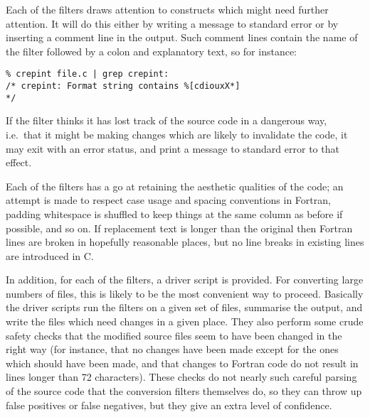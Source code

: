 \documentclass[twoside,11pt]{article}
\renewcommand{\_}{\texttt{\symbol{95}}}
\begin{document}
Each of the filters draws attention to constructs which might need 
further attention.  It will do this either by writing a message to
standard error or by inserting a comment line in the output.
Such comment lines contain the name of the filter followed by a colon
and explanatory text, so for instance:
\begin{squote}
\begin{verbatim}
% crepint file.c | grep crepint:
/* crepint: Format string contains %[cdiouxX*]                           */
\end{verbatim}
\end{squote}
If the filter thinks it has lost track of the source code in a dangerous
way, i.e.\ that it might be making changes which are likely to invalidate
the code, it may exit with an error status, and print a message to standard
error to that effect.

Each of the filters has a go at retaining the aesthetic 
qualities of the code; an attempt is made to respect 
case usage and spacing conventions in Fortran, 
padding whitespace is shuffled to keep things at the same column as
before if possible, and so on.
If replacement text is longer than the original
then Fortran lines are broken in hopefully reasonable places,
but no line breaks in existing lines are introduced in C.

In addition, for each of the filters, a driver script is provided. 
For converting large numbers of files, this is likely to be the 
most convenient way to proceed.  Basically the driver scripts 
run the filters on a given set of files, summarise the output, and
write the files which need changes in a given place.
They also perform some crude safety checks that the modified source
files seem to have been changed in the right way (for instance, that
no changes have been made except for the ones which should have been
made, and that changes to Fortran code do not result in lines longer
than 72 characters).  
These checks do not nearly such careful parsing
of the source code that the conversion filters themselves do, so
they can throw up false positives or false negatives, but they give 
an extra level of confidence.
\end{document}
